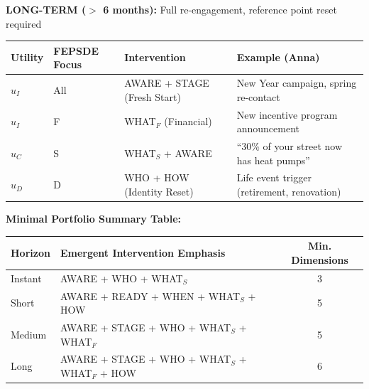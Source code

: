 \begin{tcolorbox}[colback=green!5!white, colframe=green!75!black, title=Minimal Maintenance Portfolio: Time Horizon × Utility Level × FEPSDE]
\textbf{LONG-TERM ($>$ 6 months):} Full re-engagement, reference point reset required
\begin{center}
\renewcommand{\arraystretch}{1.1}
\begin{tabular}{@{}llll@{}}
\toprule
\textbf{Utility} & \textbf{FEPSDE Focus} & \textbf{Intervention} & \textbf{Example (Anna)} \\
\midrule
$u_I$ & All & AWARE + STAGE (Fresh Start) & New Year campaign, spring re-contact \\
$u_I$ & F & WHAT$_F$ (Financial) & New incentive program announcement \\
$u_C$ & S & WHAT$_S$ + AWARE & ``30\% of your street now has heat pumps'' \\
$u_D$ & D & WHO + HOW (Identity Reset) & Life event trigger (retirement, renovation) \\
\bottomrule
\end{tabular}
\end{center}

\end{tcolorbox}

\textbf{Minimal Portfolio Summary Table:}

\begin{center}
\renewcommand{\arraystretch}{1.3}
\begin{tabular}{@{}lp{7cm}c@{}}
\toprule
\textbf{Horizon} & \textbf{Emergent Intervention Emphasis}\footnotemark & \textbf{Min. Dimensions} \\
\midrule
Instant & AWARE + WHO + WHAT$_S$ & 3 \\
Short & AWARE + READY + WHEN + WHAT$_S$ + HOW & 5 \\
Medium & AWARE + STAGE + WHO + WHAT$_S$ + WHAT$_F$ & 5 \\
Long & AWARE + STAGE + WHO + WHAT$_S$ + WHAT$_F$ + HOW & 6 \\
\bottomrule
\end{tabular}
\end{center}


